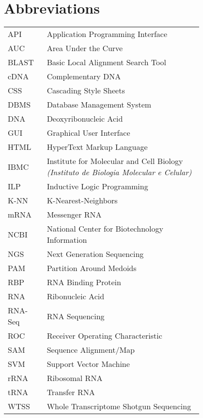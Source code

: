 \chapter*{Abbreviations}

\begin{flushleft}
\begin{tabular}{l p{0.8\linewidth}}
API       & Application Programming Interface\\
AUC       & Area Under the Curve\\
BLAST     & Basic Local Alignment Search Tool\\
cDNA      & Complementary DNA\\
CSS       & Cascading Style Sheets\\
DBMS      & Database Management System\\
DNA       & Deoxyribonucleic Acid\\
GUI       & Graphical User Interface\\
HTML      & HyperText Markup Language\\
IBMC      & Institute for Molecular and Cell Biology \textit{(Instituto de Biologia Molecular e Celular)}\\
ILP       & Inductive Logic Programming\\
K-NN      & K-Nearest-Neighbors\\
mRNA      & Messenger RNA\\
NCBI      & National Center for Biotechnology Information\\
NGS       & Next Generation Sequencing\\
PAM       & Partition Around Medoids\\
RBP       & RNA Binding Protein\\
RNA       & Ribonucleic Acid\\
RNA-Seq   & RNA Sequencing\\
ROC       & Receiver Operating Characteristic\\
SAM       & Sequence Alignment/Map\\
SVM       & Support Vector Machine\\
rRNA      & Ribosomal RNA\\
tRNA      & Transfer RNA\\
WTSS      & Whole Transcriptome Shotgun Sequencing\\
\end{tabular}
\end{flushleft}


